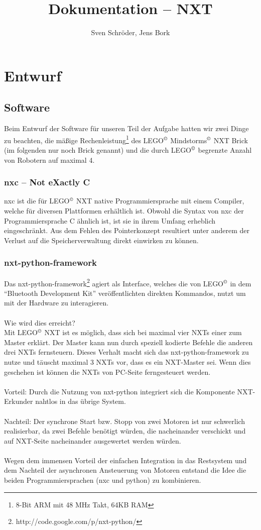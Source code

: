 \documentclass[10pt,a4paper]{scrartcl}
\author{Sven Schröder, Jens Bork}
\title{Dokumentation -- NXT}
\begin{document}
\maketitle
\tableofcontents
\section{Entwurf}
\subsection{Software}
Beim Entwurf der Software für unseren Teil der Aufgabe hatten wir zwei Dinge zu beachten, die mäßige Rechenleistung\footnote{8-Bit ARM mit 48 MHz Takt, 64KB RAM} des LEGO$^\copyright$ Mindstorms$^\copyright$ NXT Brick (im folgenden nur noch Brick genannt) und die durch LEGO$^\copyright$ begrenzte Anzahl von Robotern auf maximal 4. 
\subsubsection{nxc -- Not eXactly C}
nxc ist die für LEGO$^\copyright$ NXT native Programmiersprache mit einem Compiler, welche für diversen Plattformen erhältlich ist. Obwohl die Syntax von nxc der Programmiersprache C ähnlich ist, ist sie in ihrem Umfang erheblich eingeschränkt. Aus dem Fehlen des Pointerkonzept resultiert unter anderem der Verlust auf die Speicherverwaltung direkt einwirken zu können.
\subsubsection{nxt-python-framework}
Das nxt-python-framework\footnote{http://code.google.com/p/nxt-python/} agiert als Interface, welches die von LEGO$^\copyright$ in dem "`Bluetooth Development Kit"' veröffentlichten direkten Kommandos, nutzt um mit der Hardware zu interagieren.\\
\\
Wie wird dies erreicht?\\
Mit LEGO$^\copyright$ NXT ist es möglich, dass sich bei maximal vier NXTs einer zum Master erklärt. Der Master kann nun durch speziell kodierte Befehle die anderen drei NXTs fernsteuern. Dieses Verhalt macht sich das nxt-python-framework zu nutze und täuscht maximal 3 NXTs vor, dass es ein NXT-Master sei. Wenn dies geschehen ist können die NXTs von PC-Seite ferngesteuert werden.\\
\\
Vorteil: Durch die Nutzung von nxt-python integriert sich die Komponente NXT-Erkunder nahtlos in das übrige System.\\
\\
Nachteil: Der synchrone Start bzw. Stopp von zwei Motoren ist nur schwerlich realisierbar, da zwei Befehle benötigt würden, die nacheinander verschickt und auf NXT-Seite nacheinander ausgewertet werden würden. \\
\\
Wegen dem immensen Vorteil der einfachen Integration in das Restsystem und dem Nachteil der asynchronen Ansteuerung von Motoren entstand die Idee die beiden Programmiersprachen (nxc und python) zu kombinieren.
\end{document}
